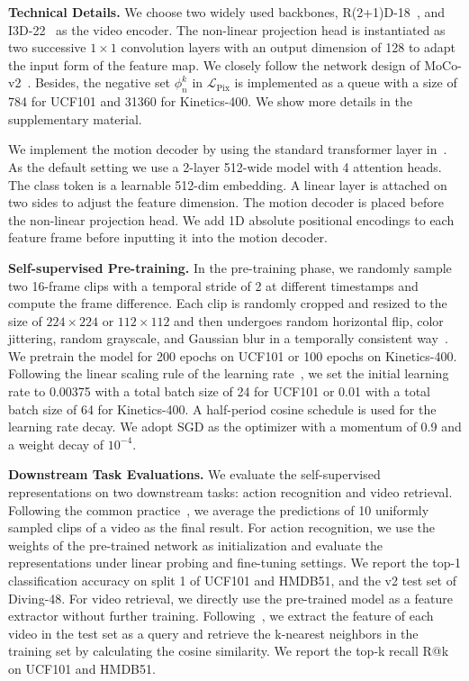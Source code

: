 \documentclass[sigconf,screen]{acmart}
\begin{document}
\noindent
{\bf Technical Details.} We choose two widely used backbones, R(2+1)D-18~\cite{R(2+1)D}, and I3D-22~\cite{I3D} as the video encoder. The non-linear projection head is instantiated as two successive $1 \times 1$ convolution layers with an output dimension of 128 to adapt the input form of the feature map. We closely follow the network design of MoCo-v2~\cite{MoCov2}. Besides, the negative set $\phi_n^k$ in $\mathcal{L}_{\mathrm{Pix}}$ is implemented as a queue with a size of 784 for UCF101 and 31360 for Kinetics-400. We show more details in the supplementary material.

We implement the motion decoder by using the standard transformer layer in~\cite{attention}. As the default setting we use a 2-layer 512-wide model with 4 attention heads. The class token is a learnable 512-dim embedding. A linear layer is attached on two sides to adjust the feature dimension. The motion decoder is placed before the non-linear projection head. We add 1D absolute positional encodings to each feature frame before inputting it into the motion decoder.

\noindent
{\bf Self-supervised Pre-training.}
In the pre-training phase, we randomly sample two 16-frame clips with a temporal stride of 2 at different timestamps and compute the frame difference. Each clip is randomly cropped and resized to the size of $224 \times 224$ or $112 \times 112$ and then undergoes random horizontal flip, color jittering, random grayscale, and Gaussian blur in a temporally consistent way~\cite{CVRL}. We pretrain the model for 200 epochs on UCF101 or 100 epochs on Kinetics-400. Following the linear scaling rule of the learning rate~\cite{1hour}, we set the initial learning rate to 0.00375 with a total batch size of 24 for UCF101 or 0.01 with a total batch size of 64 for Kinetics-400. A half-period cosine schedule is used for the learning rate decay. We adopt SGD as the optimizer with a momentum of 0.9 and a weight decay of $10^{-4}$. 

\noindent
{\bf Downstream Task Evaluations.} We evaluate the self-supervised representations on two downstream tasks: action recognition and video retrieval. Following the common practice~\cite{MemoryAug,TCLR}, we average the predictions of 10 uniformly sampled clips of a video as the final result.
For action recognition, we use the weights of the pre-trained network as initialization and evaluate the representations under linear probing and fine-tuning settings. We report the top-1 classification accuracy on split 1 of UCF101 and HMDB51, and the v2 test set of Diving-48.
For video retrieval, we directly use the pre-trained model as a feature extractor without further training. Following~\cite{cliporder}, we extract the feature of each video in the test set as a query and retrieve the k-nearest neighbors in the training set by calculating the cosine similarity. We report the top-k recall R@k on UCF101 and HMDB51.
\end{document}
